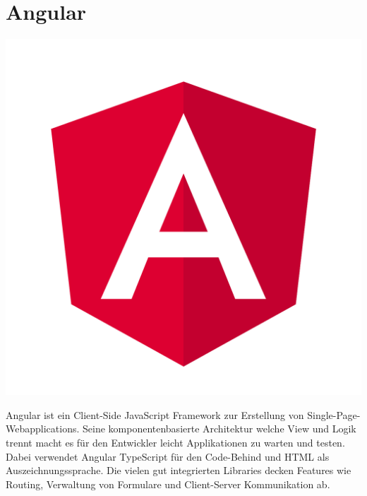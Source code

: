 \section{Angular}
\includegraphics[scale=0.02]{pics/logos/angularLogo.png}

Angular ist ein Client-Side JavaScript Framework zur Erstellung von Single-Page-Webapplications. 
Seine komponentenbasierte Architektur welche View und Logik trennt macht es für den Entwickler leicht 
Applikationen zu warten und testen. Dabei verwendet Angular TypeScript für den Code-Behind und HTML als Auszeichnungssprache. 
Die vielen gut integrierten Libraries decken Features wie Routing, Verwaltung von Formulare und Client-Server Kommunikation ab. 

